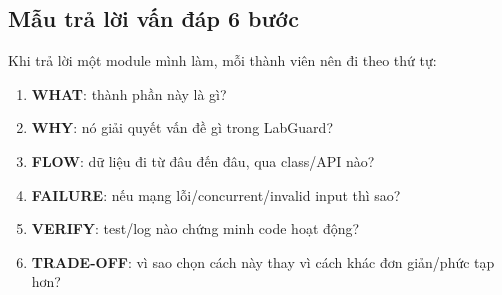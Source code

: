 \subsection*{Mẫu trả lời vấn đáp 6 bước}

Khi trả lời một module mình làm, mỗi thành viên nên đi theo thứ tự:
\begin{enumerate}
    \item \textbf{WHAT}: thành phần này là gì?
    \item \textbf{WHY}: nó giải quyết vấn đề gì trong LabGuard?
    \item \textbf{FLOW}: dữ liệu đi từ đâu đến đâu, qua class/API nào?
    \item \textbf{FAILURE}: nếu mạng lỗi/concurrent/invalid input thì sao?
    \item \textbf{VERIFY}: test/log nào chứng minh code hoạt động?
    \item \textbf{TRADE-OFF}: vì sao chọn cách này thay vì cách khác đơn giản/phức tạp hơn?
\end{enumerate}

